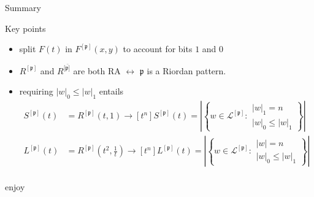 \documentclass{beamer}
\begin{document}
\begin{frame}{Summary}

  \begin{block}{Key points}
      \begin{itemize}
      \item split $F(t)$ in $F^{[\mathfrak{p}]}(x,y)$ to account for bits $1$ and $0$
      \item ${{R}^{[\mathfrak{p}]}}$ and ${{R}^{[\bar{\mathfrak{p}]}}}$ are both RA
      $\leftrightarrow$  $\mathfrak{p}$ is a Riordan pattern.
      \item requiring $|w|_{0}\leq|w|_{1}$ entails
          \begin{displaymath}
          \begin{split}
          S^{[\mathfrak{p}]}(t)&=R^{[\mathfrak{p}]}(t,1)\rightarrow 
            [t^{n}]S^{[\mathfrak{p}]}(t)= \left|\left\lbrace w \in  \mathcal{L}^{[\mathfrak{p}]}:
                \begin{array}{l} |w|_{1} = n \\ |w|_{0}\leq|w|_{1} \end{array}\right\rbrace\right|\\
          L^{[\mathfrak{p}]}(t)&=R^{[\mathfrak{p}]}\left(t^2,\frac{1}{t}\right)\rightarrow
            [t^{n}]L^{[\mathfrak{p}]}(t)= \left|\left\lbrace w \in  \mathcal{L}^{[\mathfrak{p}]}:
                \begin{array}{l} |w| = n \\ |w|_{0}\leq|w|_{1} \end{array}\right\rbrace\right|\\
          \end{split}
          \end{displaymath}
      \end{itemize}
  \end{block}
\end{frame}
  

\begin{frame}{ }
\Huge enjoy \smiley 
\end{frame}
\end{document}
